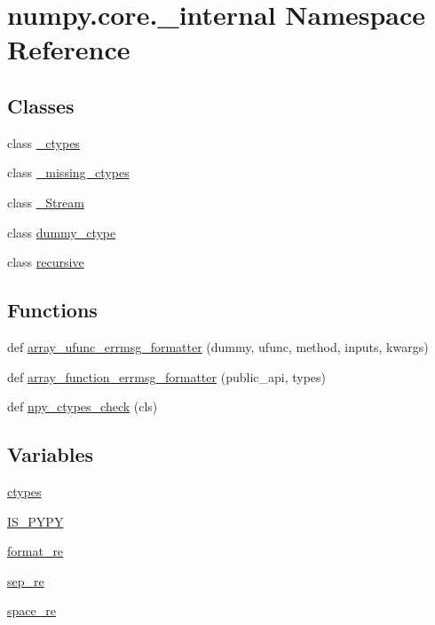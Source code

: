 \hypertarget{namespacenumpy_1_1core_1_1__internal}{}\section{numpy.\+core.\+\_\+internal Namespace Reference}
\label{namespacenumpy_1_1core_1_1__internal}
\subsection*{Classes}
\begin{DoxyCompactItemize}
\item 
class \hyperlink{classnumpy_1_1core_1_1__internal_1_1__ctypes}{\+\_\+ctypes}
\item 
class \hyperlink{classnumpy_1_1core_1_1__internal_1_1__missing__ctypes}{\+\_\+missing\+\_\+ctypes}
\item 
class \hyperlink{classnumpy_1_1core_1_1__internal_1_1__Stream}{\+\_\+\+Stream}
\item 
class \hyperlink{classnumpy_1_1core_1_1__internal_1_1dummy__ctype}{dummy\+\_\+ctype}
\item 
class \hyperlink{classnumpy_1_1core_1_1__internal_1_1recursive}{recursive}
\end{DoxyCompactItemize}
\subsection*{Functions}
\begin{DoxyCompactItemize}
\item 
def \hyperlink{namespacenumpy_1_1core_1_1__internal_a248f3bdfd562c3c96225b145054faca9}{array\+\_\+ufunc\+\_\+errmsg\+\_\+formatter} (dummy, ufunc, method, inputs, kwargs)
\item 
def \hyperlink{namespacenumpy_1_1core_1_1__internal_ae7b9bd39f6eb8523507e6748b9d8d700}{array\+\_\+function\+\_\+errmsg\+\_\+formatter} (public\+\_\+api, types)
\item 
def \hyperlink{namespacenumpy_1_1core_1_1__internal_a0d50b35548ee6d0335098edfca9c0ccb}{npy\+\_\+ctypes\+\_\+check} (cls)
\end{DoxyCompactItemize}
\subsection*{Variables}
\begin{DoxyCompactItemize}
\item 
\hyperlink{namespacenumpy_1_1core_1_1__internal_ac9d10c0697f18ef749d0748b91ae111a}{ctypes}
\item 
\hyperlink{namespacenumpy_1_1core_1_1__internal_a79ae8bf6ef9c862fcb03780a70e3321f}{I\+S\+\_\+\+P\+Y\+PY}
\item 
\hyperlink{namespacenumpy_1_1core_1_1__internal_a6550985ab6b9848b878d9e2ea0bc8627}{format\+\_\+re}
\item 
\hyperlink{namespacenumpy_1_1core_1_1__internal_a6b7327d75c1e3bc1325536d99817b076}{sep\+\_\+re}
\item 
\hyperlink{namespacenumpy_1_1core_1_1__internal_a4fb00b72d2a9d2333c5318fa8a817cee}{space\+\_\+re}
\end{DoxyCompactItemize}


